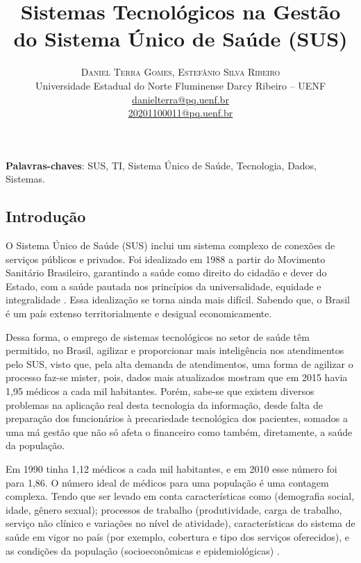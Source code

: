 \documentclass[twoside]{article}
\title{\vspace{-10mm}\fontsize{18pt}{20pt}\selectfont\textbf{Sistemas Tecnológicos na Gestão do Sistema Único de Saúde (SUS)}}
\author{
\large
\textsc{Daniel Terra Gomes,} \textsc{Estefânio Silva Ribeiro}\\[2mm]
\large Universidade Estadual do Norte Fluminense Darcy Ribeiro – UENF\\[2mm]
\smallsize \href{mailto:danielterra@pq.uenf.br}{danielterra@pq.uenf.br}\\[2mm]
\smallsize \href{mailto:20201100011@pq.uenf.br}{20201100011@pq.uenf.br}\\[2mm]
}
\date{}
\begin{document}
\maketitle

\thispagestyle{fancy}


\begin{abstract}
  \textbf{}
\end{abstract}

\vspace{2mm}

\textbf{Palavras-chaves}: SUS, TI, Sistema Único de Saúde, Tecnologia, Dados, Sistemas.
%
\vspace{0.5cm}
\begin{multicols}{2}

  \section{Introdução}

  O Sistema Único de Saúde (SUS) inclui um sistema complexo de conexões de serviços públicos e privados. Foi idealizado em 1988 a partir do Movimento Sanitário Brasileiro, garantindo a saúde como direito do cidadão e dever do Estado, com a saúde pautada nos princípios da universalidade, equidade e integralidade \cite{Miranda_2017}.
  Essa idealização se torna ainda mais difícil. Sabendo que, o Brasil é um país extenso territorialmente e desigual economicamente.

  Dessa forma, o emprego de sistemas tecnológicos no setor de saúde têm permitido, no Brasil, agilizar e proporcionar mais inteligência nos atendimentos pelo SUS, visto que, pela alta demanda de atendimentos, uma forma de agilizar o processo faz-se mister, pois, dados mais atualizados mostram que em 2015 havia 1,95 médicos a cada mil habitantes. Porém, sabe-se que existem diversos problemas na aplicação real desta tecnologia da informação, desde falta de preparação dos funcionários à precariedade tecnológica dos pacientes, somados a uma má gestão que não só afeta o financeiro como também, diretamente, a saúde da população.

  Em 1990 tinha 1,12 médicos a cada mil habitantes, e em 2010 esse número foi para 1,86. O número ideal de médicos para uma população é uma contagem complexa. Tendo que ser levado em conta características como (demografia social, idade, gênero sexual); processos de trabalho (produtividade, carga de trabalho, serviço não clínico e variações no nível de atividade), características do sistema de saúde em vigor no país (por exemplo, cobertura e tipo
  dos serviços oferecidos), e as condições da população (socioeconômicas e epidemiológicas) \cite{Oliveira_2017}.


\end{multicols}
\end{document}
